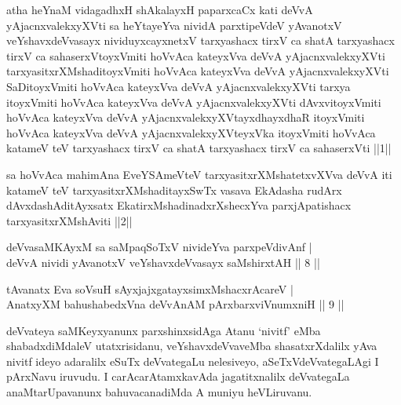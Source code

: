 \begin{shl}
atha heYnaM vidagadhxH shAkalayxH paparxcaCx kati deVvA yAjacnxvalekxyXVti sa heYtayeYva nividA parxtipeVdeV yAvanotxV veYshavxdeVvasayx nividuyxcayxnetxV tarxyashacx tirxV ca shatA tarxyashacx tirxV ca sahaserxVtoyxVmiti hoVvAca kateyxVva deVvA yAjacnxvalekxyXVti tarxyasitxrXMshaditoyxVmiti hoVvAca kateyxVva deVvA yAjacnxvalekxyXVti SaDitoyxVmiti hoVvAca kateyxVva deVvA yAjacnxvalekxyXVti tarxya itoyxVmiti hoVvAca kateyxVva deVvA yAjacnxvalekxyXVti dAvxvitoyxVmiti hoVvAca kateyxVva deVvA yAjacnxvalekxyXVtayxdhayxdhaR itoyxVmiti hoVvAca kateyxVva deVvA yAjacnxvalekxyXVteyxVka itoyxVmiti hoVvAca katameV teV tarxyashacx tirxV ca shatA tarxyashacx tirxV ca sahaserxVti ||1||
\end{shl}

\begin{shl}
sa hoVvAca mahimAna EveYSAmeVteV tarxyasitxrXMshatetxvXVva deVvA iti katameV teV tarxyasitxrXMshaditayxSwTx vasava EkAdasha rudArx dAvxdashAditAyxsatx EkatirxMshadinadxrXshecxYva parxjApatishacx tarxyasitxrXMshAviti ||2||
\end{shl}

\begin{shl}
deVvasaMKAyxM sa saMpaqSoTxV \footnotemark[3]{}nivideYva parxpeVdivAnf |\\
deVvA nividi yAvanotxV veYshavxdeVvasayx saMshirxtAH \hfill || 8 ||
\end{shl}

\begin{shl}
tAvanatx Eva soV\s suH sAyxjajxgatayxsimxMshacxrAcareV |\\
AnatxyXM bahushabedxVna deVvAnAM pArxbarxviVnumxniH \hfill || 9 ||
\end{shl}

\begin{artha}
 deVvateya saMKeyxyanunx parxshinxsidAga Atanu `nivitf' eMba shabadxdiMdaleV utatxrisidanu, veYshavxdeVvaveMba shasatxrXdalilx yAva nivitf ideyo adaralilx eSuTx deVvategaLu nelesiveyo, aSeTxVdeVvategaLAgi I pArxNavu iruvudu. I carAcarAtamxkavAda jagatitxnalilx deVvategaLa anaMtarUpavanunx bahuvacanadiMda A muniyu heVLiruvanu.
\end{artha}%

